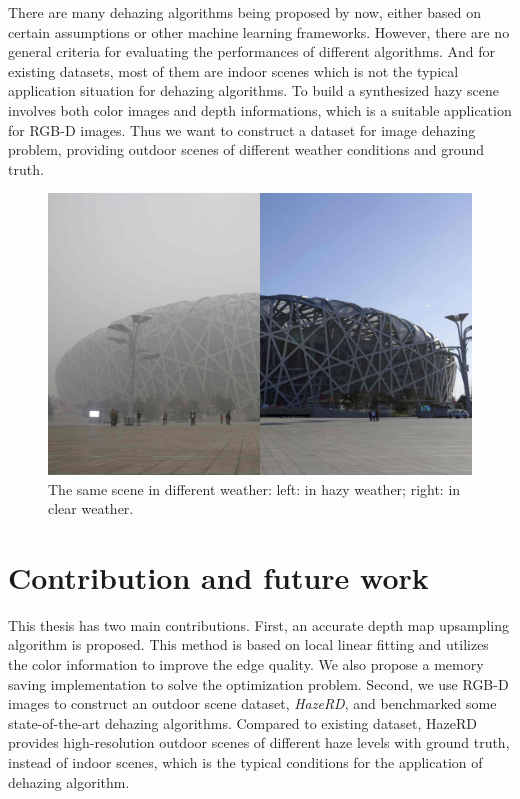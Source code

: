 There are many dehazing algorithms being proposed by now, either based on certain assumptions or other machine learning frameworks. However, there are no general criteria for evaluating the performances of different algorithms. And for existing datasets, most of them are indoor scenes which is not the typical application situation for dehazing algorithms. To build a synthesized hazy scene involves both color images and depth informations, which is a suitable application for RGB-D images. Thus we want to construct a dataset for image dehazing problem, providing outdoor scenes of different weather conditions and ground truth. 

\begin{figure}[htb]
\begin{minipage}[b]{0.95\linewidth}
  \centering
  \centerline{\includegraphics[width = 12cm]{intro/hazeba.jpg}}
\end{minipage}
\caption{The same scene in different weather: left: in hazy weather; right: in clear weather. }
\label{fig1:haze}
\end{figure}


\section{Contribution and future work}
\label{sec:1.3.conclusion}
This thesis has two main contributions. First, an accurate depth map upsampling algorithm is proposed. This method is based on local linear fitting and utilizes the color information to improve the edge quality. We also propose a memory saving implementation to solve the optimization problem. Second, we use RGB-D images to construct an outdoor scene dataset, \emph{HazeRD}, and benchmarked some state-of-the-art dehazing algorithms. Compared to existing dataset, HazeRD provides high-resolution outdoor scenes of different haze levels with ground truth, instead of indoor scenes, which is the typical conditions for the application of dehazing algorithm. 


